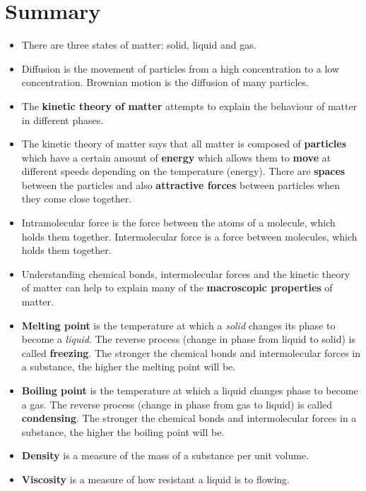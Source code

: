             \section{Summary}
            \nopagebreak
\label{m38730*id311034}\begin{itemize}[noitemsep]
            \label{m38730*id973}\item There are three states of matter: solid, liquid and gas.\label{m38730*id872}\item Diffusion is the movement of particles from a high concentration to a low concentration. Brownian motion is the diffusion of many particles.\label{m38730*uid80}\item The \textbf{kinetic theory of 
matter} attempts to explain the behaviour of matter in different 
phases.
\label{m38730*uid81}\item The kinetic theory of matter says that all matter is 
composed of \textbf{particles} which have a certain 
amount of \textbf{energy} which allows them to 
\textbf{move} at different speeds depending on the 
temperature (energy). There are \textbf{spaces} 
between the particles and also \textbf{attractive 
forces} between particles when they come close together.
\label{m38730*id643}\item Intramolecular force is the force between the atoms of a molecule, which holds 
them together. Intermolecular force is a force between molecules, which holds them together. \label{m38730*uid82}\item Understanding chemical bonds, intermolecular forces and 
the kinetic theory of matter can help to explain many of the \textbf{macroscopic properties} of matter.
\label{m38730*uid83}\item \textbf{Melting point} is the 
temperature at which a \textsl{solid} changes its 
phase to become a \textsl{liquid}. The reverse 
process (change in phase from liquid to solid) is called \textbf{freezing}. The stronger the chemical bonds and 
intermolecular forces in a substance, the higher the melting point will be.
\label{m38730*uid84}\item \textbf{Boiling point} is the 
temperature at which a liquid changes phase to become a gas. The reverse 
process (change in phase from gas to liquid) is called \textbf{condensing}. The stronger the 
chemical bonds and intermolecular forces in a substance, the higher the boiling 
point will be.
\label{m38730*uid85}\item \textbf{Density} is a measure 
of the mass of a substance per unit volume.
\label{m38730*uid86}\item \textbf{Viscosity} is a 
measure of how resistant a liquid is to flowing.
\end{itemize}
